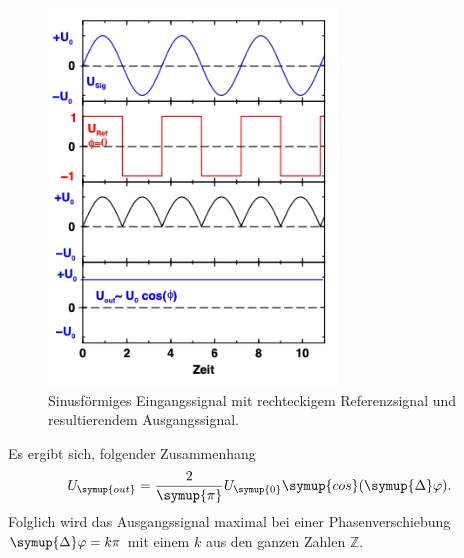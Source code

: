 \begin{figure} [H]
    \centering
    \includegraphics[height=10cm]{content/Bilder/Signalverlaeufe.png}
    \caption{Sinusförmiges Eingangssignal mit rechteckigem Referenzsignal und resultierendem %
    Ausgangssignal.\cite{v303}}
    \label{fig:Signalverlaeufe}
\end{figure}

Es ergibt sich, folgender Zusammenhang
\begin{equation}
    U_{\symup{out}} = \frac{2}{\symup{\pi}}U_{\symup{0}}\symup{cos}(\symup{\Delta}\varphi).
    \label{eq:Ausgangssignal Proportionalitaet}
\end{equation}
Folglich wird das Ausgangssignal maximal bei einer Phasenverschiebung $\symup{\Delta}\varphi = k\pi$ mit einem $k$ aus den ganzen
Zahlen $\mathbb{Z}$.
